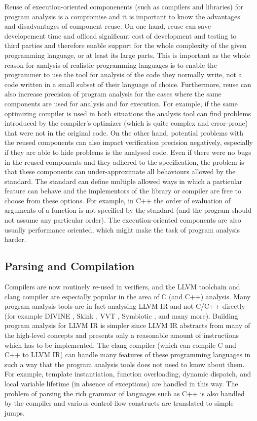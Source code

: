 Reuse of execution-oriented componenents (such as compilers and libraries) for
program analysis is a compromise and it is important to know the advantages and
disadvantages of component reuse.
On one hand, reuse can save developement time and offload significant cost
of development and testing to third parties and therefore enable support for the whole complexity of the given programming language, or at least its large parts.
This is important as the whole reason for analysis of realistic programming languages is to enable the programmer to use the tool for analysis of the code they normally write, not a code written in a small subset of their language of choice.
Furthermore, reuse can also increase precision of program analysis for the cases where the same components are used for analysis and for execution.
For example, if the same optimizing compiler is used in both situations the analysis tool can find problems introduced by the compiler's optimizer (which is quite complex and error-prone) that were not in the original code.
On the other hand, potential problems with the reused components can also
impact verification precision negatively, especially if they are able to hide
problems is the analysed code.
Even if there were no bugs in the reused components and they adhered to the specification, the problem is that these components can under-approximate all behaviours allowed by the standard.
The standard can define multiple allowed ways in which a particular feature can behave and the implementors of the library or compiler are free to choose from these options.
For example, in C++ the order of evaluation of arguments of a function is not specified by the standard (and the program should not assume any particular order).
The execution-oriented components are also usually performance oriented, which might make the task of program analysis harder.

\subsection{Parsing and Compilation}

Compilers are now routinely re-used in verifiers, and the LLVM toolchain and clang compiler are especially popular in the area of C (and C++) analysis.
Many program analysis tools are in fact analysing LLVM IR and not C/C++ directly (for example DIVINE , Skink , VVT , Symbiotic , and many more).
Building program analysis for LLVM IR is simpler since LLVM IR abstracts from
many of the high-level concepts and presents only a reasonable amount of
instructions which has to be implemented.
The clang compiler (which can compile C and C++ to LLVM IR) can handle many
features of these programming languages in such a way that the program analysis
tools does not need to know about them.
For example, template instantiation, function overloading, dynamic dispatch, and
local variable lifetime (in absence of exceptions) are handled in this way.
The problem of parsing the rich grammar of languages such as C++ is
also handled by the compiler and various control-flow constructs are translated
to simple jumps.

